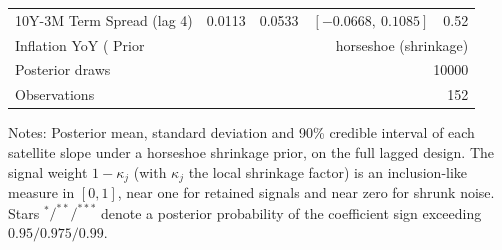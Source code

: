 \begin{table}[!htbp]
\begin{tabular}{lrrrr}
10Y-3M Term Spread (lag 4) & 0.0113 & 0.0533 & $[-0.0668,\ 0.1085]$ & 0.52 \\
Inflation YoY (%
\midrule
Prior & \multicolumn{4}{r}{horseshoe (shrinkage)} \\
Posterior draws & \multicolumn{4}{r}{10000} \\
Observations & \multicolumn{4}{r}{152} \\
\bottomrule
\end{tabular}
\begin{tablenotes}\small
\item Notes: Posterior mean, standard deviation and 90\% credible interval of each satellite slope under a horseshoe shrinkage prior, on the full lagged design. The signal weight $1-\kappa_j$ (with $\kappa_j$ the local shrinkage factor) is an inclusion-like measure in $[0,1]$, near one for retained signals and near zero for shrunk noise. Stars $^{*}/^{**}/^{***}$ denote a posterior probability of the coefficient sign exceeding $0.95/0.975/0.99$.
\end{tablenotes}
\end{table}
